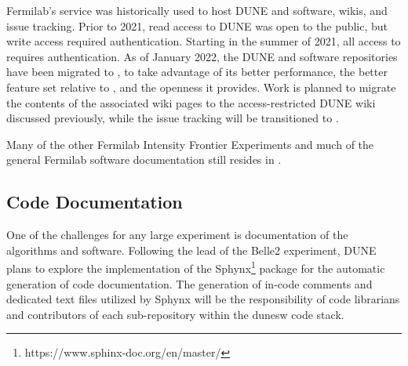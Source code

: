 \documentclass[../main-v1.tex]{subfiles}
\begin{document}
Fermilab's  service was historically used to host DUNE  and  software, wikis, and issue tracking.  Prior to 2021, read access to DUNE  was open to the public, but write access required authentication.  Starting in the summer of 2021, all access to  requires authentication.  As of January 2022, the DUNE  and  software repositories have been migrated to , to take advantage of its better performance, the better feature set %
relative to , and the openness it provides. Work is planned to migrate the contents of the associated wiki pages to the access-restricted DUNE wiki discussed previously, while the issue tracking will be transitioned to .  

Many of the other Fermilab Intensity Frontier Experiments and much of the general Fermilab software documentation still resides in .

\subsection{Code Documentation}
One of the challenges for any large experiment is documentation of the algorithms and software. Following the lead of the Belle2 experiment, DUNE plans to explore the implementation of the Sphynx\footnote{https://www.sphinx-doc.org/en/master/} package for the automatic generation of code documentation. The generation of in-code comments and dedicated text files utilized by Sphynx will be the responsibility of code librarians and contributors of each sub-repository within the dunesw code stack.

\end{document}
